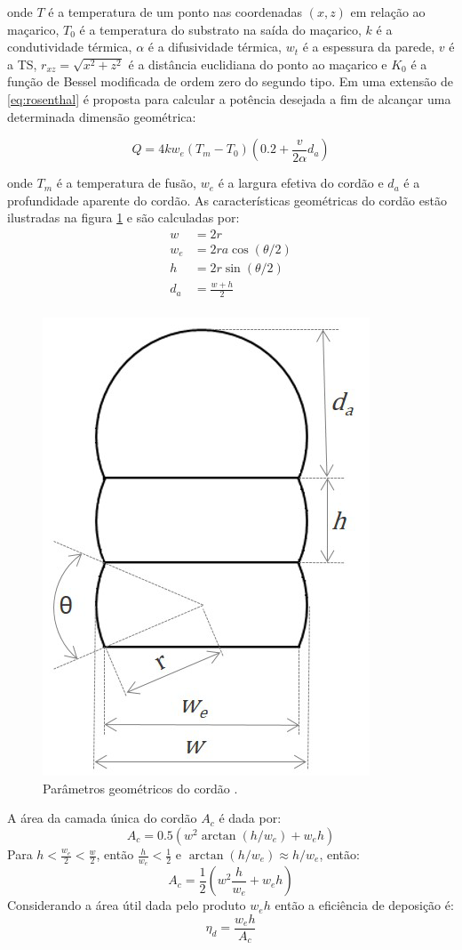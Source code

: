 onde $T$ é a temperatura de um ponto nas coordenadas $(x,z)$ em relação ao maçarico, $T_0$ é a temperatura do substrato na saída do maçarico, $k$ é a condutividade térmica, $\alpha$ é a difusividade térmica, $w_t$ é a espessura da parede, $v$ é a TS, $r_{xz} = \sqrt{x^2+z^2}$ é a distância euclidiana do ponto ao maçarico e $K_0$ é a função de Bessel modificada de ordem zero do segundo tipo. Em \cite{rios2018analytical} uma extensão de \ref{eq:rosenthal} é proposta para calcular a potência desejada a fim de alcançar uma determinada dimensão geométrica:

\begin{equation} 
    Q = 4kw_e(T_m-T_0)(0.2+\frac{v}{2\alpha}d_a) \label{eq:rios}
\end{equation}

onde $T_m$ é a temperatura de fusão, $w_e$ é a largura efetiva do cordão e $d_a$ é a profundidade aparente do cordão. As características geométricas do cordão estão ilustradas na figura \ref{fig:bead_geom} e são calculadas por:
\begin{align}
    w &= 2r \label{eq:w}\\
    w_e &= 2ra\cos(\theta/2) \\
    h &= 2r\sin(\theta/2) \\
    d_a &= \frac{w+h}{2} \label{eq:d_a} \\
\end{align}

\begin{figure}[hbt!]
    \centering
    \includegraphics[width=0.3\linewidth]{Imagens/chap02/bead_geom.png}
    \caption{Parâmetros geométricos do cordão \cite{bendia2021multivariable}.}
    \label{fig:bead_geom}
\end{figure}

A área da camada única do cordão $A_c$ é dada por:
\begin{equation}
    A_c = 0.5(w^2\arctan(h/w_e) + w_eh)
\end{equation}
Para  $h < \frac{w_e}{2} < \frac{w}{2}$, então $\frac{h}{w_e} < \frac{1}{2}$ e $\arctan(h/w_e) \approx h / w_e$, então:
\begin{equation}
    A_c = \frac{1}{2} \left(w^2\frac{h}{w_e} + w_e h\right) \label{eq:area_bead}
\end{equation}
Considerando a área útil dada pelo produto $w_e h$ então a eficiência de deposição é:
\begin{equation}
    \eta_d = \frac{w_e h}{A_c} \label{eq:eta_d}
\end{equation}

